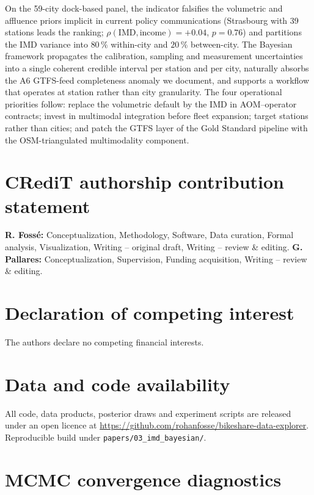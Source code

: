 \documentclass[11pt,a4paper]{article}
\newcommand{\IMD}{\mathrm{IMD}}
\begin{document}
On the 59-city dock-based panel, the indicator falsifies the
volumetric and affluence priors implicit in current policy
communications (Strasbourg with 39 stations leads the ranking;
$\rho(\IMD, \text{income}) = +0.04$, $p = 0.76$) and partitions
the IMD variance into $80\,\%$ within-city and $20\,\%$
between-city. The Bayesian framework propagates the
calibration, sampling and measurement uncertainties into a
single coherent credible interval per station and per city,
naturally absorbs the A6 GTFS-feed completeness anomaly we
document, and supports a workflow that operates at
station rather than city granularity. The four operational
priorities follow: replace the volumetric default by the IMD
in AOM--operator contracts; invest in multimodal integration
before fleet expansion; target stations rather than cities;
and patch the GTFS layer of the Gold Standard pipeline with the
OSM-triangulated multimodality component.

\section*{CRediT authorship contribution statement}

\textbf{R. Foss\'e:} Conceptualization, Methodology, Software,
Data curation, Formal analysis, Visualization, Writing -- original
draft, Writing -- review \& editing.
\textbf{G. Pallares:} Conceptualization, Supervision, Funding
acquisition, Writing -- review \& editing.

\section*{Declaration of competing interest}

The authors declare no competing financial interests.

\section*{Data and code availability}

All code, data products, posterior draws and experiment scripts
are released under an open licence at
\url{https://github.com/rohanfosse/bikeshare-data-explorer}.
Reproducible build under
\texttt{papers/03\_imd\_bayesian/}.

\appendix

\section{MCMC convergence diagnostics}
\label{app:diagnostics}
\end{document}
